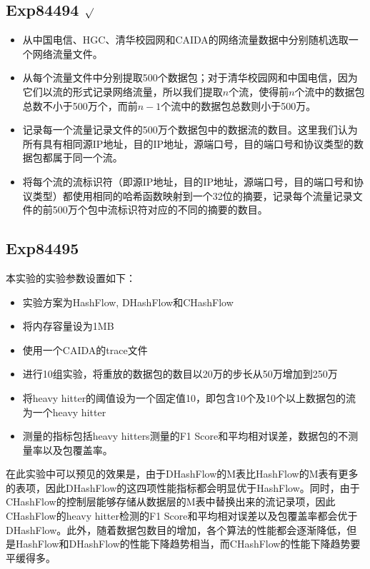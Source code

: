 \documentclass{article}
\begin{document}
\subsection{Exp84494 $\surd$}
\begin{itemize}
	\item 从中国电信、HGC、清华校园网和CAIDA的网络流量数据中分别随机选取一个网络流量文件。
	\item 从每个流量文件中分别提取500个数据包；对于清华校园网和中国电信，因为它们以流的形式记录网络流量，所以我们提取$n$个流，使得前$n$个流中的数据包总数不小于500万个，而前$n-1$个流中的数据包总数则小于500万。
	\item 记录每一个流量记录文件的500万个数据包中的数据流的数目。这里我们认为所有具有相同源IP地址，目的IP地址，源端口号，目的端口号和协议类型的数据包都属于同一个流。
	\item 将每个流的流标识符（即源IP地址，目的IP地址，源端口号，目的端口号和协议类型）都使用相同的哈希函数映射到一个32位的摘要，记录每个流量记录文件的前500万个包中流标识符对应的不同的摘要的数目。
\end{itemize}



\subsection{Exp84495}
本实验的实验参数设置如下：
\begin{itemize}
\item 实验方案为HashFlow, DHashFlow和CHashFlow
\item 将内存容量设为1MB
\item 使用一个CAIDA的trace文件
\item 进行10组实验，将重放的数据包的数目以20万的步长从50万增加到250万
\item 将heavy hitter的阈值设为一个固定值10，即包含10个及10个以上数据包的流为一个heavy hitter
\item 测量的指标包括heavy hitters测量的F1 Score和平均相对误差，数据包的不测量率以及包覆盖率。
\end{itemize}

在此实验中可以预见的效果是，由于DHashFlow的M表比HashFlow的M表有更多的表项，因此DHashFlow的这四项性能指标都会明显优于HashFlow。同时，由于CHashFlow的控制层能够存储从数据层的M表中替换出来的流记录项，因此CHashFlow的heavy hitter检测的F1 Score和平均相对误差以及包覆盖率都会优于DHashFlow。此外，随着数据包数目的增加，各个算法的性能都会逐渐降低，但是HashFlow和DHashFlow的性能下降趋势相当，而CHashFlow的性能下降趋势要平缓得多。
\end{document}
